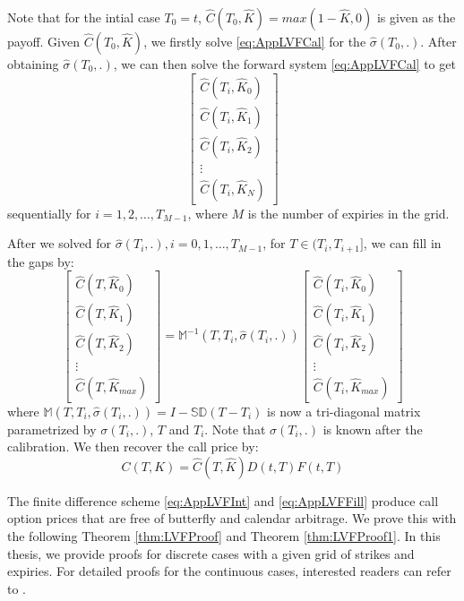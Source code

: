\documentclass[letterpaper,12pt,titlepage,oneside,final]{book}
\numberwithin{equation}{section}
\theoremstyle{definition}
\begin{document}
 Note that for the intial case $T_0=t$, $\widehat{C}(T_0,\widehat{K})=max(1-\widehat{K},0)$ is given as the payoff. Given $\widehat{C}(T_0,\widehat{K})$, we firstly solve \eqref{eq:AppLVFCal} for the $\widehat{\sigma}(T_0,.).$ After obtaining $\widehat{\sigma}(T_0,.)$, we can then solve the forward system  \eqref{eq:AppLVFCal} to get \[
	 \begin{bmatrix}
		 \widehat{C}(T_i,\widehat{K}_0)\\
		 \widehat{C}(T_i,\widehat{K}_1)\\
		 \widehat{C}(T_i,\widehat{K}_2)\\
		 \vdots\\
		 \widehat{C}(T_i,\widehat{K}_{N})
		 \end{bmatrix}
 \] sequentially for $i=1,2,\dots,T_{M-1}$, where $M$ is the number of expiries in the grid.
 
 
 
 
 After we solved for  $\widehat{\sigma}(T_i,.), i=0,1,\dots,T_{M-1}$, for $T \in (T_i,T_{i+1}]$, we can fill in the gaps by:
	 \begin{equation}
	 \begin{bmatrix}
	 \widehat{C}(T,\widehat{K}_0)\\
	 \widehat{C}(T,\widehat{K}_1)\\
	 \widehat{C}(T,\widehat{K}_2)\\
	 \vdots\\
	 \widehat{C}(T,\widehat{K}_{max})
	 \end{bmatrix}=\mathcal{\mathbb{M}}^{-1} (T,T_{i}, \widehat{\sigma}(T_i,.))\begin{bmatrix}
		 \widehat{C}_{}(T_{i},\widehat{K}_0)\\
		 \widehat{C}_{}(T_{i},\widehat{K}_1)\\
		 \widehat{C}_{}(T_{i},\widehat{K}_2)\\
		 \vdots\\
		 \widehat{C}_{}(T_{i},\widehat{K}_{max})
		 \end{bmatrix}
		 \label{eq:AppLVFFill}
	 \end{equation}
 where $\mathcal{\mathbb{M}} (T,T_{i}, \widehat{\sigma}(T_i,.))=I-\mathcal{\mathbb{S}}\mathcal{\mathbb{D}}(T-T_i)$ is now a tri-diagonal matrix parametrized by  $\sigma(T_i,.)$, $T$ and $T_i$. Note that $\sigma(T_i,.)$ is known after the calibration.
 We then recover the call price by:
 \[
 C(T,K)=\widehat{C}(T,\widehat{K}){D(t,T)F(t,T)}
 \]
 
 The finite difference scheme \eqref{eq:AppLVFInt} and  \eqref{eq:AppLVFFill} 
produce call option prices that are free of butterfly and calendar arbitrage. We prove this with the following Theorem \ref{thm:LVFProof} and Theorem \ref{thm:LVFProof1}. In this thesis, we provide proofs for discrete cases with a given grid of strikes and expiries. For detailed proofs for the continuous cases, interested readers can refer to \cite{andreasen2010volatility}.
\end{document}
